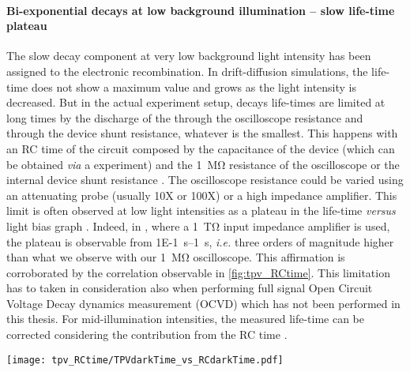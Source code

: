 	\paragraph{Bi-exponential decays at low background illumination -- slow life-time plateau}
	The slow decay component at very low background light intensity has been assigned to the electronic recombination.
	In drift-diffusion simulations, the life-time does not show a maximum value and grows as the light intensity is decreased.
	But in the actual experiment setup, decays life-times are limited at long times by the discharge of the through the oscilloscope resistance and through the device shunt resistance, whatever is the smallest.
	This happens with an RC time of the circuit composed by the capacitance of the device (which can be obtained \textit{via} a  experiment) and the \SI{1}{\Mohm} resistance of the oscilloscope or the internal device shunt resistance \cite{Tvingstedt2017}.
	The oscilloscope resistance could be varied using an attenuating probe (usually 10X or 100X) or a high impedance amplifier.
	This limit is often observed at low light intensities as a plateau in the  life-time \textit{versus} light bias graph \cite{Tvingstedt2017}.
	Indeed, in , where a \SI{1}{\tera\ohm} input impedance amplifier is used, the plateau is observable from \SIrange{1E-1}{1}{\s}, \textit{i.e.} three orders of magnitude higher than what we observe with our \SI{1}{\Mohm} oscilloscope.
	This affirmation is corroborated by the correlation observable in \cref{fig:tpv_RCtime}.
	This limitation has to taken in consideration also when performing full signal Open Circuit Voltage Decay dynamics measurement (OCVD) \cite{Tvingstedt2017} which has not been performed in this thesis.
	For mid-illumination intensities, the measured life-time can be corrected considering the contribution from the RC time \cite{Credgington2014}.

	\begin{SCfigure}
		\centering
		\texttt{[image: tpv\_RCtime/TPVdarkTime\_vs\_RCdarkTime.pdf]}
		\label{fig:tpv_RCtime}
	\end{SCfigure}

